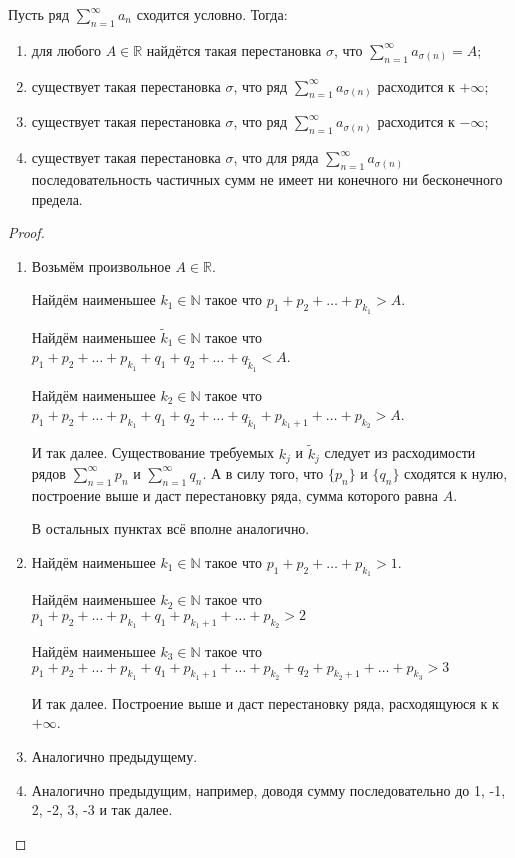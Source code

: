 \documentclass[a4paper, 12pt]{article}
\begin{document}
	\begin{Theorem}[Римана]
		Пусть ряд $\sum\limits_{n=1}^{\infty}a_n$ сходится условно. Тогда:
		\begin{enumerate}
			\item для любого $A \in \mathbb{R}$ найдётся такая перестановка $\sigma$, что $\sum\limits_{n=1}^{\infty}a_{\sigma(n)} = A $;
			\item существует такая перестановка $\sigma$, что ряд $\sum\limits_{n=1}^{\infty}a_{\sigma(n)}$ расходится к $+\infty$;
			\item существует такая перестановка $\sigma$, что ряд $\sum\limits_{n=1}^{\infty}a_{\sigma(n)}$ расходится к $-\infty$;
			\item существует такая перестановка $\sigma$, что для ряда $\sum\limits_{n=1}^{\infty}a_{\sigma(n)}$ последовательность частичных сумм не имеет ни конечного ни бесконечного предела.
		\end{enumerate}
	\end{Theorem}
	\begin{proof} \ 
		\begin{enumerate}
			\item Возьмём произвольное $A \in \mathbb{R}$.  
			
			Найдём наименьшее $k_1 \in \mathbb{N}$ такое что $p_1+p_2+\dots+p_{k_1} > A$. 
			
			Найдём наименьшее $\tilde{k}_1 \in \mathbb{N}$ такое что $p_1+p_2+\dots+p_{k_1} + q_1+q_2 +\dots +q_{\tilde{k}_1} < A$.
			
			Найдём наименьшее $k_2 \in \mathbb{N}$ такое что $p_1+p_2+\dots+p_{k_1} + q_1+q_2 +\dots +q_{\tilde{k}_1}+ p_{k_1+1}+\dots+p_{k_2} > A$.
			
			И так далее. Существование требуемых $k_j$ и $\tilde{k}_j$ следует из расходимости рядов $\sum\limits_{n=1}^{\infty}p_n$ и $\sum\limits_{n=1}^{\infty}q_n$. А в силу того, что $\{p_n\}$ и $\{q_n\}$ сходятся к нулю, построение выше и даст перестановку ряда, сумма которого равна $A$.
			
			В остальных пунктах всё вполне аналогично.
			\item 
			Найдём наименьшее $k_1 \in \mathbb{N}$ такое что $p_1+p_2+\dots+p_{k_1} > 1$. 
			
			Найдём наименьшее $k_2 \in \mathbb{N}$ такое что $p_1+p_2+\dots+p_{k_1} + q_1+ p_{k_1+1}+\dots+p_{k_2} > 2$ 

			Найдём наименьшее $k_3 \in \mathbb{N}$ такое что $p_1+p_2+\dots+p_{k_1} + q_1+ p_{k_1+1}+\dots+p_{k_2} + q_2
			+ p_{k_2+1}+\dots+p_{k_3} > 3$ 

			И так далее. Построение выше и даст перестановку ряда, расходящуюся к к $+\infty$.
			\item Аналогично предыдущему.
			\item Аналогично предыдущим, например, доводя сумму последовательно до 1, -1, 2, -2, 3, -3 и так далее.
		\end{enumerate}
	\end{proof}
\end{document}
